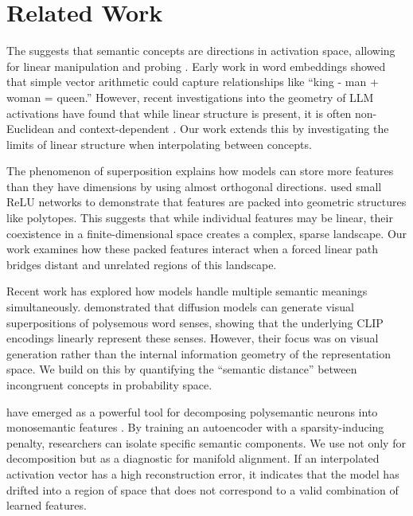 \section{Related Work}

 The \lrh suggests that semantic concepts are directions in activation space, allowing for linear manipulation and probing \cite{park2023linear, jiang2024origins}. Early work in word embeddings \cite{elhage2021mathematical} showed that simple vector arithmetic could capture relationships like ``king - man + woman = queen.'' However, recent investigations into the geometry of LLM activations have found that while linear structure is present, it is often non-Euclidean and context-dependent \cite{park2023linear}. Our work extends this by investigating the limits of linear structure when interpolating between \incongruent concepts.

 The phenomenon of superposition \cite{elhage2022toy} explains how models can store more features than they have dimensions by using almost orthogonal directions. \citet{elhage2022toy} used small ReLU networks to demonstrate that features are packed into geometric structures like polytopes. This suggests that while individual features may be linear, their coexistence in a finite-dimensional space creates a complex, sparse landscape. Our work examines how these packed features interact when a forced linear path bridges distant and unrelated regions of this landscape.

 Recent work has explored how models handle multiple semantic meanings simultaneously. \citet{white2022schrodinger} demonstrated that diffusion models can generate visual superpositions of polysemous word senses, showing that the underlying CLIP encodings linearly represent these senses. However, their focus was on visual generation rather than the internal information geometry of the representation space. We build on this by quantifying the ``semantic distance'' between incongruent concepts in probability space.

 \saes have emerged as a powerful tool for decomposing polysemantic neurons into monosemantic features \cite{cunningham2023sparse, bricken2023monosemanticity}. By training an autoencoder with a sparsity-inducing penalty, researchers can isolate specific semantic components. We use \saes not only for decomposition but as a diagnostic for manifold alignment. If an interpolated activation vector has a high reconstruction error, it indicates that the model has drifted into a region of space that does not correspond to a valid combination of learned features.

